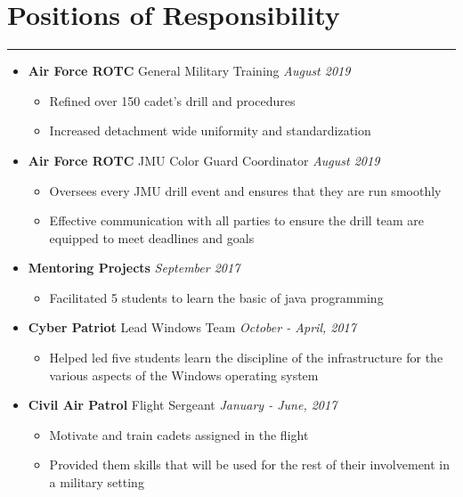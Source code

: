 \documentclass[a4paper]{article}
\begin{document}
\section*{Positions of Responsibility}
\hrule
\vspace{3mm}
\begin{itemize}
	\item
	      \textbf{Air Force ROTC} General Military Training
		  \hfill \textit{August 2019}
	      \begin{itemize}
	      	\vspace{-2mm} \setlength\itemsep{-0.7mm}
	      	\item Refined over 150 cadet's drill and procedures
		\item Increased detachment wide uniformity and standardization
	      \end{itemize}
	\item
	      \textbf{Air Force ROTC} JMU Color Guard Coordinator
		  \hfill \textit{August 2019}
	      \begin{itemize}
	      	\vspace{-2mm} \setlength\itemsep{-0.7mm}
	      	\item Oversees every JMU drill event and ensures that they are run smoothly
		\item Effective communication with all parties to ensure the drill team are equipped to meet deadlines and goals
	      \end{itemize}
	\item
	      \textbf{Mentoring Projects}
		  \hfill \textit{September 2017}
	      \begin{itemize}
	      	\vspace{-2mm} \setlength\itemsep{-0.7mm}
	      	\item Facilitated 5 students to learn the basic of java programming
	      \end{itemize}
	\item
	      \textbf{Cyber Patriot} Lead Windows Team
	      \hfill \textit{October - April, 2017}
	      \begin{itemize}
	      	\vspace{-2mm} \setlength\itemsep{-0.7mm}
		\item Helped led five students learn the discipline of the infrastructure for the various aspects of the Windows operating system
	      \end{itemize}
	\item
	      \textbf{Civil Air Patrol} Flight Sergeant
	      \hfill \textit{January - June, 2017}
	      \begin{itemize}
	      	\vspace{-2mm} \setlength\itemsep{-0.7mm}
		\item Motivate and train cadets assigned in the flight
		\item Provided them skills that will be used for the rest of their involvement in a military setting
	      \end{itemize}
\end{itemize}
\end{document}
